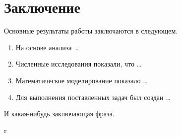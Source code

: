 \chapter*{Заключение}						%

Основные результаты работы заключаются в следующем.
\begin{enumerate}
  \item На основе анализа \ldots
  \item Численные исследования показали, что \ldots
  \item Математическое моделирование показало \ldots
  \item Для выполнения поставленных задач был создан \ldots
\end{enumerate}
И какая-нибудь заключающая фраза.

r~\cite{Grigorev6}

\clearpage
